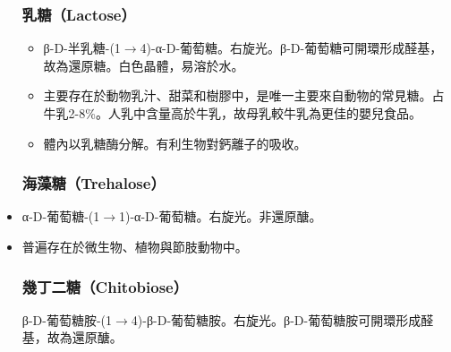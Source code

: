 \documentclass[a4paper,12pt]{report}
\begin{document}
\begin{itemize}
\subsubsection{乳糖（Lactose）}
\begin{itemize}
\item β-D-半乳糖-(1$\to$4)-α-D-葡萄糖。右旋光。β-D-葡萄糖可開環形成醛基，故為還原糖。白色晶體，易溶於水。
\item 主要存在於動物乳汁、甜菜和樹膠中，是唯一主要來自動物的常見糖。占牛乳2-8\%。人乳中含量高於牛乳，故母乳較牛乳為更佳的嬰兒食品。
\item 體內以乳糖酶分解。有利生物對鈣離子的吸收。
\end{itemize}
\subsubsection{海藻糖（Trehalose）}
\bit
\item α-D-葡萄糖-(1$\to$1)-α-D-葡萄糖。右旋光。非還原醣。
\item 普遍存在於微生物、植物與節肢動物中。
\eit
\subsubsection{幾丁二糖（Chitobiose）}
β-D-葡萄糖胺-(1$\to$4)-β-D-葡萄糖胺。右旋光。β-D-葡萄糖胺可開環形成醛基，故為還原醣。

\end{itemize}
\end{document}
